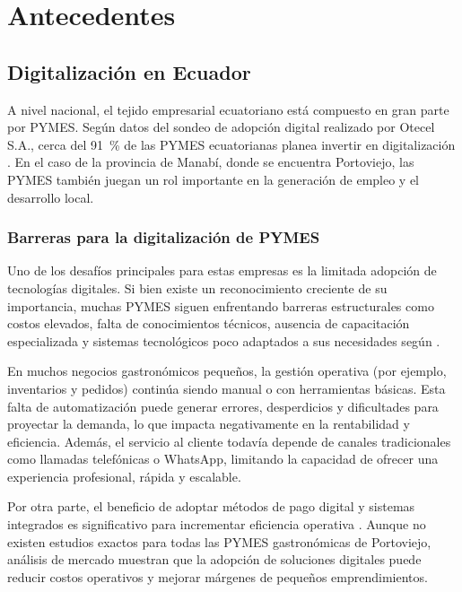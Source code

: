 \section{Antecedentes}


\subsection{Digitalización en Ecuador}

A nivel nacional, el tejido empresarial ecuatoriano está compuesto en gran parte por PYMES. Según datos del sondeo de adopción digital realizado por Otecel S.A., cerca del 91~\% de las PYMES ecuatorianas planea invertir en digitalización \parencite{MovistarEmpresas2024}. En el caso de la provincia de Manabí, donde se encuentra Portoviejo, las PYMES también juegan un rol importante en la generación de empleo y el desarrollo local.

\subsubsection{Barreras para la digitalización de PYMES}

Uno de los desafíos principales para estas empresas es la limitada adopción de tecnologías digitales. Si bien existe un reconocimiento creciente de su importancia, muchas PYMES siguen enfrentando barreras estructurales como costos elevados, falta de conocimientos técnicos, ausencia de capacitación especializada y sistemas tecnológicos poco adaptados a sus necesidades según \parencite{DuranMero2024, AyoraRecalde2024}.

En muchos negocios gastronómicos pequeños, la gestión operativa (por ejemplo, inventarios y pedidos) continúa siendo manual o con herramientas básicas. Esta falta de automatización puede generar errores, desperdicios y dificultades para proyectar la demanda, lo que impacta negativamente en la rentabilidad y eficiencia. Además, el servicio al cliente todavía depende de canales tradicionales como llamadas telefónicas o WhatsApp, limitando la capacidad de ofrecer una experiencia profesional, rápida y escalable.

Por otra parte, el beneficio de adoptar métodos de pago digital y sistemas integrados es significativo para incrementar eficiencia operativa \parencite{Vistazo2025}. Aunque no existen estudios exactos para todas las PYMES gastronómicas de Portoviejo, análisis de mercado muestran que la adopción de soluciones digitales puede reducir costos operativos y mejorar márgenes de pequeños emprendimientos.

